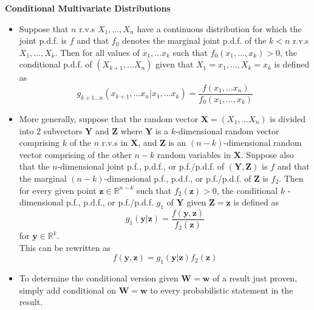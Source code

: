 \documentclass[11pt]{article}
\begin{document}
\begin{itemize}
    \textbf{Conditional Multivariate Distributions}
    \begin{itemize}
        \item Suppose that $n$ r.v.s $X_1, \ldots, X_n$ have a continuous distribution for 
        which the joint p.d.f. is $f$ and that $f_0$ denotes the marginal joint p.d.f. of the
        $k < n$ r.v.s $X_1, \ldots, X_k$. Then for all values of $x_1, \ldots x_k$ such that 
        $f_0(x_1, \ldots, x_k) > 0$, the conditional p.d.f. of $(X_{k+1}, \ldots X_n)$ given 
        that $X_1=x_1, \ldots, X_k=x_k$ is defined as 
        \[g_{k+1 \ldots n}(x_{k+1}, \ldots x_n | x_1, \ldots x_k) = \frac{f(x_1, \ldots x_n)}
        {f_0(x_1, \ldots, x_k)}\]
        \item More generally, suppose that the random vector $\boldsymbol{X}=(X_1, \ldots X_n)
        $ is divided into 2 subvectors $\boldsymbol{Y}$ and $\boldsymbol{Z}$ where 
        $\boldsymbol{Y}$ is a $k$-dimensional random vector comprising $k$ of the $n$ r.v.s in 
        $\boldsymbol{X}$, and $\boldsymbol{Z}$ is an $(n-k)$-dimensional random vector 
        comprising of the other $n-k$ random variables in $\boldsymbol{X}$. Suppose also that 
        the $n$-dimensional joint p.f., p.d.f., or p.f./p.d.f. of $(\boldsymbol{Y}, 
        \boldsymbol{Z})$ is $f$ and that the marginal $(n-k)$-dimensional p.f., p.d.f., or
        p.f./p.d.f. of $\boldsymbol{Z}$ is $f_2$. Then for every given point $\boldsymbol{z}
        \in \mathbb{R}^{n-k}$ such that $f_2(\boldsymbol{z})>0$, the conditional $k$
        -dimensional p.f., p.d.f., or p.f./p.d.f. $g_1$ of $\boldsymbol{Y}$ given 
        $\boldsymbol{Z} = \boldsymbol{z}$ is defined as 
        \[g_1(\boldsymbol{y}|\boldsymbol{z}) = \frac{f(\boldsymbol{y}, \boldsymbol{z})}
        {f_2(\boldsymbol{z})}\]
        for $\boldsymbol{y} \in \mathbb{R}^k$. \\

        This can be rewritten as
        \[f(\boldsymbol{y}, \boldsymbol{z}) = g_1(\boldsymbol{y}|\boldsymbol{z})f_2(
        \boldsymbol{z})\]
        \item To determine the conditional version given $\boldsymbol{W} = \boldsymbol{w}$ of 
        a result just proven, simply add conditional on $\boldsymbol{W} = \boldsymbol{w}$ to 
        every probabilistic statement in the result. 
    \end{itemize}


\end{itemize}
\end{document}
